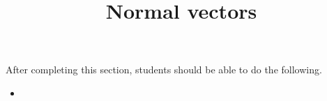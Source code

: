 \documentclass{ximera}
\title{Normal vectors}
\begin{document}
\begin{abstract}
\end{abstract}

\maketitle

\begin{sectionOutcomes}

After completing this section, students should be able to do the following.

\begin{itemize}
\item 
\end{itemize}

\end{sectionOutcomes}
\end{document}
